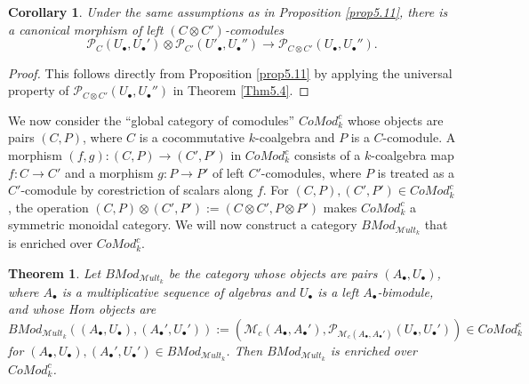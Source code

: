 \documentclass[10pt, colorlinks]{article}
\numberwithin{equation}{section} \DeclareMathSizes{2}{10}{12}{13}
\newtheorem{Thm}[thm]{Theorem}
\newtheorem{cor}[thm]{Corollary}
\begin{document}
\begin{cor}\label{cor5.12p}
    Under the same assumptions as in Proposition \ref{prop5.11}, there is a canonical morphism of left $(C\otimes C')$-comodules 
    \begin{equation}
        \mathcal P_C(U_\bullet,U_\bullet')\otimes \mathcal P_{C'}(U'_\bullet,U_\bullet'')\longrightarrow \mathcal P_{C\otimes C'}(U_\bullet,U_\bullet'').
    \end{equation}
\end{cor}
\begin{proof}
    This follows directly from Proposition \ref{prop5.11} by applying the universal property of $\mathcal P_{C\otimes C'}(U_\bullet,U_\bullet'')$ in Theorem 
\ref{Thm5.4}.
\end{proof}




    We now consider the ``global category of comodules'' $CoMod^c_k$ whose objects are pairs $(C,P)$, where $C$ is a cocommutative $k$-coalgebra and $P$ is a $C$-comodule.   A morphism $(f,g):(C,P)\longrightarrow (C',P')$ in $CoMod^c_k$ consists of a $k$-coalgebra map $f:C\longrightarrow C'$ and a morphism $g:P\longrightarrow P'$ of left $C'$-comodules, where $P$ is treated as a $C'$-comodule by corestriction of scalars along $f$.   For $(C,P),(C',P')\in CoMod^c_k$, the operation $(C,P)\otimes(C',P'):=(C\otimes C',P\otimes P')$ makes $CoMod^c_k$ a symmetric monoidal category. We will now construct a category $BMod_{\mathscr Mult_k}$ that is enriched over $CoMod^c_k$.



\begin{Thm}\label{ils5.11}
    Let $BMod_{\mathscr Mult_k}$ be the category whose objects are pairs $(A_\bullet,U_\bullet)$, where $A_\bullet$ is a multiplicative sequence of algebras and $U_\bullet$ is a left $A_\bullet$-bimodule, and whose Hom objects are   
        \begin{equation}
            BMod_{\mathscr Mult_k}((A_\bullet,U_\bullet),(A_\bullet',U_\bullet')):=(\mathcal M_c(A_\bullet,A_\bullet'),\mathcal P_{\mathcal M_c(A_\bullet,A_\bullet')}(U_\bullet,U_\bullet'))\in CoMod^c_k
        \end{equation}
        for $(A_\bullet,U_\bullet),(A_\bullet',U_\bullet')\in BMod_{\mathscr Mult_k}$. Then $BMod_{\mathscr Mult_k}$ is enriched over $CoMod^c_k$.
\end{Thm}
\end{document}

